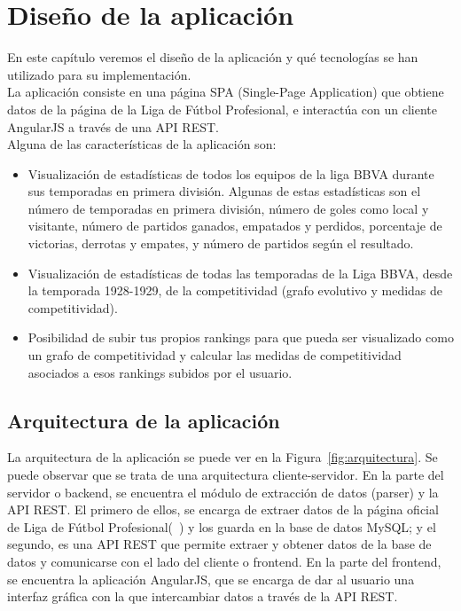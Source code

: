 \chapter{Diseño de la aplicación}

En este capítulo veremos el diseño de la aplicación y qué tecnologías se han utilizado para su implementación.\\

La aplicación consiste en una página SPA (Single-Page Application) que obtiene datos de la página de la Liga de Fútbol Profesional, e interactúa con un cliente AngularJS a través de una API REST.\\

Alguna de las características de la aplicación son:

\begin{itemize}
\item Visualización de estadísticas de todos los equipos de la liga BBVA durante sus temporadas en primera división. Algunas de estas estadísticas son el número de temporadas en primera división, número de goles como local y visitante, número de partidos ganados, empatados y perdidos, porcentaje de victorias, derrotas y empates, y número de partidos según el resultado.

\item Visualización de estadísticas de todas las temporadas de la Liga BBVA, desde la temporada 1928-1929, de la competitividad (grafo evolutivo y medidas de competitividad).

\item Posibilidad de subir tus propios rankings para que pueda ser visualizado como un grafo de competitividad y calcular las medidas de competitividad asociados a esos rankings subidos por el usuario.
\end{itemize}

\section{Arquitectura de la aplicación}

La arquitectura de la aplicación se puede ver en la Figura~\ref{fig:arquitectura}. Se puede observar que se trata de una arquitectura cliente-servidor. En la parte del servidor o backend, se encuentra el módulo de extracción de datos (parser) y la API REST. El primero de ellos, se encarga de extraer datos de la página oficial de Liga de Fútbol Profesional(~\cite{lfp}) y los guarda en la base de datos MySQL; y el segundo, es una API REST que permite extraer y obtener datos de la base de datos y comunicarse con el lado del cliente o frontend. En la parte del frontend, se encuentra la aplicación AngularJS, que se encarga de dar al usuario una interfaz gráfica con la que intercambiar datos a través de la API REST.

